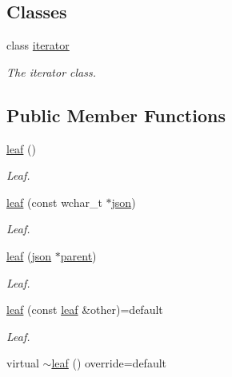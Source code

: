 \subsection*{Classes}
\begin{DoxyCompactItemize}
\item 
class \hyperlink{classformat_1_1leaf_1_1iterator}{iterator}
\begin{DoxyCompactList}\small\item\em The iterator class. \end{DoxyCompactList}\end{DoxyCompactItemize}
\subsection*{Public Member Functions}
\begin{DoxyCompactItemize}
\item 
\hyperlink{classformat_1_1leaf_a218f3826712c4cb9056cb61624253d60}{leaf} ()\hypertarget{classformat_1_1leaf_a218f3826712c4cb9056cb61624253d60}{}\label{classformat_1_1leaf_a218f3826712c4cb9056cb61624253d60}

\begin{DoxyCompactList}\small\item\em Leaf. \end{DoxyCompactList}\item 
\hyperlink{classformat_1_1leaf_a21f677a477468cf7604d251d835d0823}{leaf} (const wchar\+\_\+t $\ast$\hyperlink{classformat_1_1json}{json})
\begin{DoxyCompactList}\small\item\em Leaf. \end{DoxyCompactList}\item 
\hyperlink{classformat_1_1leaf_ac3e3d8c7aa7e81bca038b31df80f4aef}{leaf} (\hyperlink{classformat_1_1json}{json} $\ast$\hyperlink{classformat_1_1value_a86c03ec8810bfd0d60ec49095120040d}{parent})
\begin{DoxyCompactList}\small\item\em Leaf. \end{DoxyCompactList}\item 
\hyperlink{classformat_1_1leaf_ac0001e636d8511d4c7bbf59f8cf0706b}{leaf} (const \hyperlink{classformat_1_1leaf}{leaf} \&other)=default
\begin{DoxyCompactList}\small\item\em Leaf. \end{DoxyCompactList}\item 
virtual \hyperlink{classformat_1_1leaf_a445166bd9ca7296bbda80ec4a1128ef1}{$\sim$leaf} () override=default\hypertarget{classformat_1_1leaf_a445166bd9ca7296bbda80ec4a1128ef1}{}\label{classformat_1_1leaf_a445166bd9ca7296bbda80ec4a1128ef1}


\end{DoxyCompactItemize}
